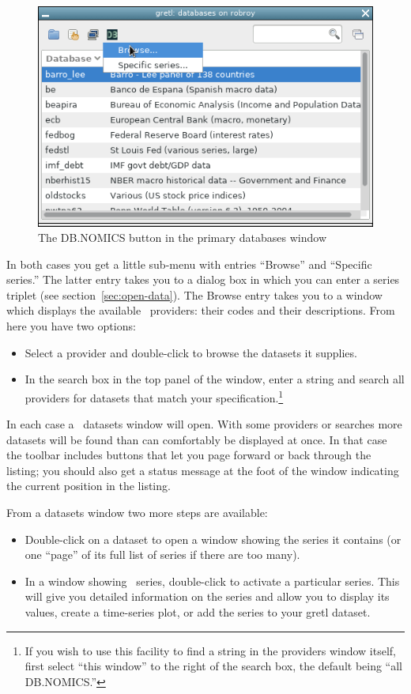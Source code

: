 \documentclass{article}
\begin{document}
\begin{figure}[htbp]
  \centering
  \includegraphics[scale=0.5]{db-access-2}
  \caption{The DB.NOMICS button in the primary databases window}
  \label{fig:db-access-2}
\end{figure}

In both cases you get a little sub-menu with entries
``\textsf{Browse}'' and ``\textsf{Specific series}.'' The latter entry
takes you to a dialog box in which you can enter a series triplet (see
section~\ref{sec:open-data}). The \textsf{Browse} entry takes you to a
window which displays the available \DB\ providers: their
codes and their descriptions. From here you have two options:
\begin{itemize}
\item Select a provider and double-click to browse the datasets it
  supplies.
\item In the search box in the top panel of the window, enter a string
  and search all providers for datasets that match your
  specification.\footnote{If you wish to use this facility to find a
    string in the providers window itself, first select ``\textsf{this
      window}'' to the right of the search box, the default being
    ``\textsf{all DB.NOMICS}.''}
\end{itemize}

In each case a \DB\ datasets window will open. With some
providers or searches more datasets will be found than can comfortably
be displayed at once. In that case the toolbar includes buttons that
let you page forward or back through the listing; you should also get
a status message at the foot of the window indicating the current
position in the listing.

From a datasets window two more steps are available:
\begin{itemize}
\item Double-click on a dataset to open a window showing the series it
  contains (or one ``page'' of its full list of series if there are
  too many).
\item In a window showing \DB\ series, double-click to
  activate a particular series. This will give you detailed
  information on the series and allow you to display its values,
  create a time-series plot, or add the series to your gretl dataset.
\end{itemize}
\end{document}
